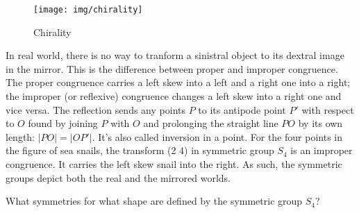 \documentclass[b5paper]{article}
\begin{document}
\begin{figure}[htbp]
 \centering
 \texttt{[image: img/chirality]}
 \caption{Chirality}
 \label{fig:chirality}
\end{figure}

In real world, there is no way to tranform a sinistral object to its dextral image in the mirror. This is the difference between proper and improper congruence. The proper congruence carries a left skew into a left and a right one into a right; the improper (or reflexive) congruence changes a left skew into a right one and vice versa\cite{Weyl1952}. The reflection sends any points $P$ to its antipode point $P'$ with respect to $O$ found by joining $P$ with $O$ and prolonging the straight line $PO$ by its own length: $|PO| = |OP'|$. It's also called inversion in a point. For the four points in the figure of sea snails, the transform (2 4) in symmetric group $S_4$ is an improper congruence. It carries the left skew snail into the right. As such, the symmetric groups depict both the real and the mirrored worlds.

\begin{Exercise}\label{ex:symmetry-and-group}
What symmetries for what shape are defined by the symmetric group $S_4$?
\end{Exercise}
\end{document}
